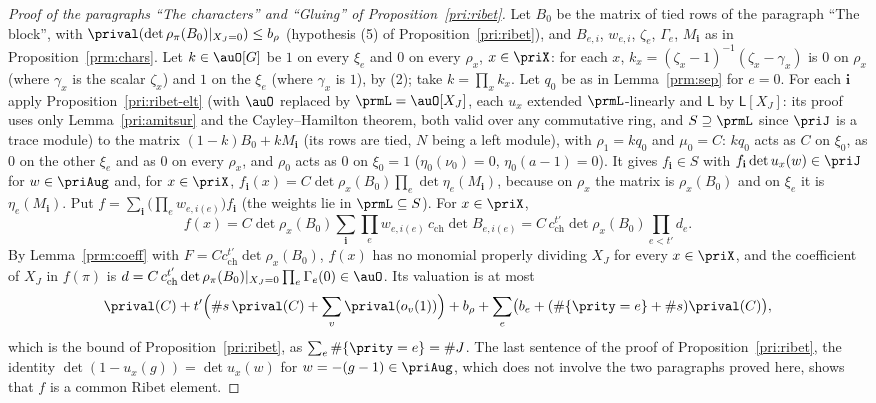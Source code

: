 \documentclass[10pt]{amsart}
\theoremstyle{definition}
\theoremstyle{remark}
\begin{document}
\begin{proof}[Proof of the paragraphs ``The characters'' and ``Gluing'' of Proposition~\ref{pri:ribet}]
Let $B_0$ be the matrix of tied rows of the paragraph ``The block'', with $\prival(\det\rho_\pi(B_0)
|_{X_J=0})\le b_\rho$ (hypothesis (5) of Proposition~\ref{pri:ribet}), and $B_{e,i}$, $w_{e,i}$, $\zeta_e$, $\Gamma_e$, $M_{\mathbf i}$ as in
Proposition~\ref{prm:chars}. Let $k\in\auO[G]$ be $1$ on every $\xi_e$ and $0$ on every $\rho_x$,
$x\in\priX$: for each $x$, $k_x=(\zeta_x-1)^{-1}(\zeta_x-\gamma_x)$ is $0$ on $\rho_x$ (where $\gamma_x$
is the scalar $\zeta_x$) and $1$ on the $\xi_e$ (where $\gamma_x$ is $1$), by (2); take $k=\prod_xk_x$. Let
$q_0$ be as in Lemma~\ref{prm:sep} for $e=0$. For each $\mathbf i$ apply
Proposition~\ref{pri:ribet-elt} (with $\auO$ replaced by $\prmL=\auO[X_J]$, each $u_x$ extended $\prmL$-linearly and $\mathsf L$ by $\mathsf L[X_J]$: its proof uses only Lemma~\ref{pri:amitsur} and the Cayley--Hamilton theorem, both valid over any commutative ring, and $S\supseteq\prmL$ since $\priJ$ is a trace module) to the matrix $(1-k)B_0+kM_{\mathbf i}$ (its rows are tied, $N$ being a
left module), with $\rho_1=kq_0$ and $\mu_0=C$: $kq_0$ acts as $C$ on $\xi_0$, as $0$ on the other
$\xi_e$ and as $0$ on every $\rho_x$, and $\rho_0$ acts as $0$ on $\xi_0=1$ ($\eta_0(\nu_0)=0$,
$\eta_0(a-1)=0$). It gives $f_{\mathbf i}\in S$ with $f_{\mathbf i}\det u_x(w)\in\priJ$ for $w\in
\priAug$ and, for $x\in\priX$, $f_{\mathbf i}(x)=C\det\rho_x(B_0)\prod_e\det\eta_e(M_{\mathbf i})$, because
on $\rho_x$ the matrix is $\rho_x(B_0)$ and on $\xi_e$ it is $\eta_e(M_{\mathbf i})$. Put $f=\sum_{\mathbf
i}\bigl(\prod_ew_{e,i(e)}\bigr)f_{\mathbf i}$ (the weights lie in $\prmL\subseteq S$). For $x\in\priX$,
\[
f(x)=C\det\rho_x(B_0)\sum_{\mathbf i}\prod_ew_{e,i(e)}\,c_{\mathrm{ch}}\det B_{e,i(e)}=C\,c_{\mathrm{ch}}^{t'}\det\rho_x(B_0)
\prod_{e<t'}d_e .
\]
By Lemma~\ref{prm:coeff} with $F=Cc_{\mathrm{ch}}^{t'}\det\rho_x(B_0)$, $f(x)$ has no monomial properly dividing
$X_J$ for every $x\in\priX$, and the coefficient of $X_J$ in $f(\pi)$ is
$d=C\,c_{\mathrm{ch}}^{t'}\det\rho_\pi(B_0)|_{X_J=0}\prod_e\Gamma_e(0)\in\auO$. Its valuation is at most
\[
\prival(C)+t'\Bigl(\#s\,\prival(C)+\sum_v\prival(o_v(1))\Bigr)+b_\rho+\sum_e\bigl(b_e+(\#\{\prity=e\}+\#s)
\prival(C)\bigr),
\]
which is the bound of Proposition~\ref{pri:ribet}, as $\sum_e\#\{\prity=e\}=\#J$. The last sentence of
the proof of Proposition~\ref{pri:ribet}, the identity $\det(1-u_x(g))=\det u_x(w)$ for $w=-(g-1)\in\priAug$, which does not involve the two paragraphs proved here, shows that $f$ is a common Ribet element.
\end{proof}
\end{document}
